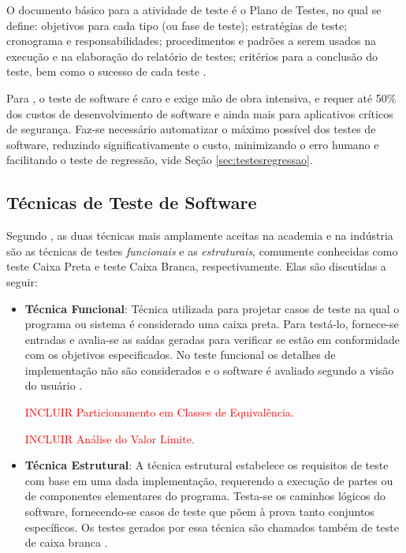 O documento básico para a atividade de teste é o Plano de Testes, no qual se define: objetivos para cada tipo (ou fase de teste); estratégias de teste; cronograma e responsabilidades; procedimentos e padrões a serem usados na execução e na elaboração do relatório de testes; critérios para a conclusão do teste, bem como o sucesso de cada teste \cite{HIRAMA2011}.

Para , o teste de software é caro e exige mão de obra intensiva, e requer até 50\% dos custos de desenvolvimento de software e ainda mais para aplicativos críticos de segurança. Faz-se necessário automatizar o máximo possível dos testes de software, reduzindo significativamente o custo, minimizando o erro humano e facilitando o teste de regressão, vide Seção \ref{sec:testesregressao}.


\subsection{Técnicas de Teste de Software}


Segundo , as duas técnicas mais amplamente aceitas na academia e na indústria são as técnicas de testes \textit{funcionais} e as \textit{estruturais}, comumente conhecidas como teste Caixa Preta e teste Caixa Branca, respectivamente. Elas são discutidas a seguir:



\begin{itemize}
    \item \textbf{Técnica Funcional}: Técnica utilizada para projetar casos de teste na qual o programa ou sistema é considerado uma caixa preta. Para testá-lo, fornece-se entradas e avalia-se as saídas geradas para verificar se estão em conformidade com os objetivos especificados. No teste funcional os detalhes de implementação não são considerados e o software é avaliado segundo a visão do usuário \cite{DELAMARO2007}.
    
    \textcolor{red}{INCLUIR Particionamento em Classes de Equivalência.}
    
    \textcolor{red}{INCLUIR Análise do Valor Limite.}
    
    
    \item \textbf{Técnica Estrutural}: A técnica estrutural estabelece os requisitos de teste com base em uma dada implementação, requerendo a execução de partes ou de componentes elementares do programa. Testa-se os caminhos lógicos do software, fornecendo-se casos de teste que põem à prova tanto conjuntos específicos. Os testes gerados por essa técnica são chamados também de teste de caixa branca \cite{DELAMARO2007}.
    
\end{itemize}

